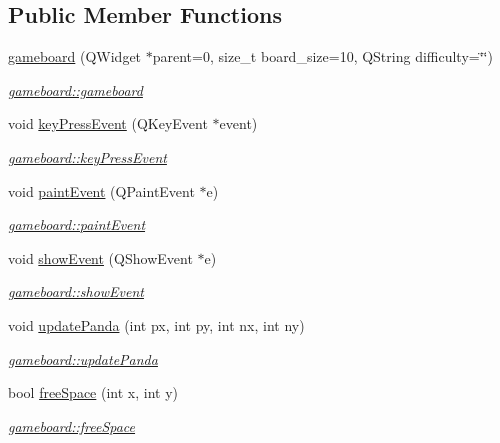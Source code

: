 \subsection*{Public Member Functions}
\begin{DoxyCompactItemize}
\item 
\hyperlink{classgameboard_a2c3d659a178d78c6facbf103e526bec3}{gameboard} (Q\+Widget $\ast$parent=0, size\+\_\+t board\+\_\+size=10, Q\+String difficulty=\char`\"{}\char`\"{})
\begin{DoxyCompactList}\small\item\em \hyperlink{classgameboard_a2c3d659a178d78c6facbf103e526bec3}{gameboard\+::gameboard} \end{DoxyCompactList}\item 
void \hyperlink{classgameboard_a426162fac3b314115067be644865cdaf}{key\+Press\+Event} (Q\+Key\+Event $\ast$event)
\begin{DoxyCompactList}\small\item\em \hyperlink{classgameboard_a426162fac3b314115067be644865cdaf}{gameboard\+::key\+Press\+Event} \end{DoxyCompactList}\item 
void \hyperlink{classgameboard_a7c2f3cab761a2d642a0f0fb2b430a21d}{paint\+Event} (Q\+Paint\+Event $\ast$e)
\begin{DoxyCompactList}\small\item\em \hyperlink{classgameboard_a7c2f3cab761a2d642a0f0fb2b430a21d}{gameboard\+::paint\+Event} \end{DoxyCompactList}\item 
void \hyperlink{classgameboard_a62459809a28e3835f62a5311f13e22eb}{show\+Event} (Q\+Show\+Event $\ast$e)
\begin{DoxyCompactList}\small\item\em \hyperlink{classgameboard_a62459809a28e3835f62a5311f13e22eb}{gameboard\+::show\+Event} \end{DoxyCompactList}\item 
void \hyperlink{classgameboard_a8e25be708d9320ce9469f4d1ce8d7f51}{update\+Panda} (int px, int py, int nx, int ny)
\begin{DoxyCompactList}\small\item\em \hyperlink{classgameboard_a8e25be708d9320ce9469f4d1ce8d7f51}{gameboard\+::update\+Panda} \end{DoxyCompactList}\item 
bool \hyperlink{classgameboard_a0fc88e04adf7ae7243984c61f28f1368}{free\+Space} (int x, int y)
\begin{DoxyCompactList}\small\item\em \hyperlink{classgameboard_a0fc88e04adf7ae7243984c61f28f1368}{gameboard\+::free\+Space} \end{DoxyCompactList}\item 

\end{DoxyCompactItemize}
